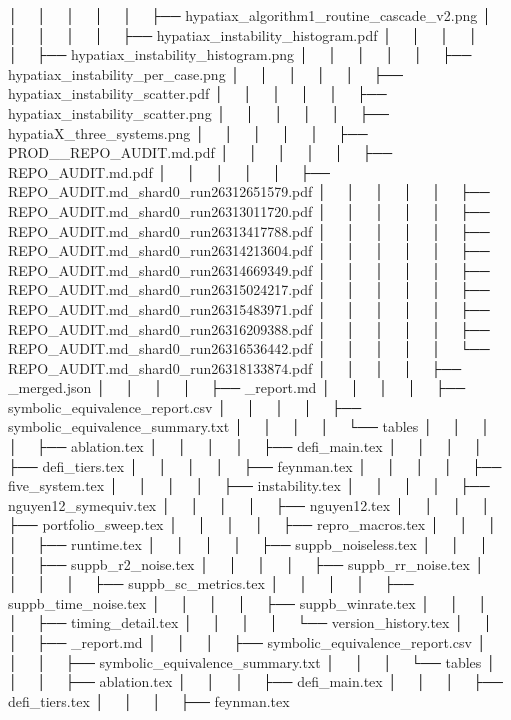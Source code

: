 │   │       │   │   │   ├── hypatiax_algorithm1_routine_cascade_v2.png
│   │       │   │   │   ├── hypatiax_instability_histogram.pdf
│   │       │   │   │   ├── hypatiax_instability_histogram.png
│   │       │   │   │   ├── hypatiax_instability_per_case.png
│   │       │   │   │   ├── hypatiax_instability_scatter.pdf
│   │       │   │   │   ├── hypatiax_instability_scatter.png
│   │       │   │   │   ├── hypatiaX_three_systems.png
│   │       │   │   │   ├── PROD__REPO_AUDIT.md.pdf
│   │       │   │   │   ├── REPO_AUDIT.md.pdf
│   │       │   │   │   ├── REPO_AUDIT.md_shard0_run26312651579.pdf
│   │       │   │   │   ├── REPO_AUDIT.md_shard0_run26313011720.pdf
│   │       │   │   │   ├── REPO_AUDIT.md_shard0_run26313417788.pdf
│   │       │   │   │   ├── REPO_AUDIT.md_shard0_run26314213604.pdf
│   │       │   │   │   ├── REPO_AUDIT.md_shard0_run26314669349.pdf
│   │       │   │   │   ├── REPO_AUDIT.md_shard0_run26315024217.pdf
│   │       │   │   │   ├── REPO_AUDIT.md_shard0_run26315483971.pdf
│   │       │   │   │   ├── REPO_AUDIT.md_shard0_run26316209388.pdf
│   │       │   │   │   ├── REPO_AUDIT.md_shard0_run26316536442.pdf
│   │       │   │   │   └── REPO_AUDIT.md_shard0_run26318133874.pdf
│   │       │   │   ├── _merged.json
│   │       │   │   ├── _report.md
│   │       │   │   ├── symbolic_equivalence_report.csv
│   │       │   │   ├── symbolic_equivalence_summary.txt
│   │       │   │   └── tables
│   │       │   │       ├── ablation.tex
│   │       │   │       ├── defi_main.tex
│   │       │   │       ├── defi_tiers.tex
│   │       │   │       ├── feynman.tex
│   │       │   │       ├── five_system.tex
│   │       │   │       ├── instability.tex
│   │       │   │       ├── nguyen12_symequiv.tex
│   │       │   │       ├── nguyen12.tex
│   │       │   │       ├── portfolio_sweep.tex
│   │       │   │       ├── repro_macros.tex
│   │       │   │       ├── runtime.tex
│   │       │   │       ├── suppb_noiseless.tex
│   │       │   │       ├── suppb_r2_noise.tex
│   │       │   │       ├── suppb_rr_noise.tex
│   │       │   │       ├── suppb_sc_metrics.tex
│   │       │   │       ├── suppb_time_noise.tex
│   │       │   │       ├── suppb_winrate.tex
│   │       │   │       ├── timing_detail.tex
│   │       │   │       └── version_history.tex
│   │       │   ├── _report.md
│   │       │   ├── symbolic_equivalence_report.csv
│   │       │   ├── symbolic_equivalence_summary.txt
│   │       │   └── tables
│   │       │       ├── ablation.tex
│   │       │       ├── defi_main.tex
│   │       │       ├── defi_tiers.tex
│   │       │       ├── feynman.tex
